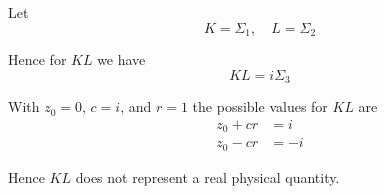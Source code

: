 


\bigskip
Let
\begin{equation*}
K=\Sigma_1,\quad L=\Sigma_2
\end{equation*}

Hence for $KL$ we have
\begin{equation*}
KL=i\Sigma_3
\end{equation*}

With $z_0=0$, $c=i$, and $r=1$ the possible values for $KL$ are
\begin{align*}
z_0+cr&=i
\\
z_0-cr&=-i
\end{align*}

Hence $KL$ does not represent a real physical quantity.


